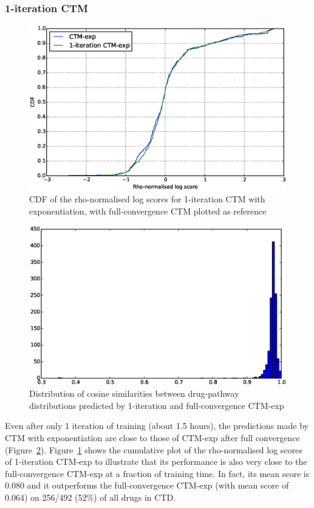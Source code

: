 \documentclass[12pt,a4paper,twoside,openright]{report}
\begin{document}
\subsubsection{1-iteration CTM}

\begin{figure}[!htb]
\includegraphics[width=\textwidth]{ctd-ctm-1iter-rho.eps}
\caption{CDF of the rho-normalised log scores for 1-iteration CTM with exponentiation, with full-convergence CTM plotted as reference}
\label{fig:ctd-ctm-1iter-rho}
\end{figure}

\begin{figure}[!htb]
\includegraphics[width=\textwidth]{ctd-ctm-1iter-hist.eps}
\caption{Distribution of cosine similarities between drug-pathway distributions predicted by 1-iteration and full-convergence CTM-exp}
\label{fig:ctd-ctm-1iter-hist}
\end{figure}

Even after only 1 iteration of training (about 1.5 hours), the predictions made by CTM with exponentiation are close to those of CTM-exp after full convergence (Figure~\ref{fig:ctd-ctm-1iter-hist}). Figure~\ref{fig:ctd-ctm-1iter-rho} shows the cumulative plot of the rho-normalised log scores of 1-iteration CTM-exp to illustrate that its performance is also very close to the full-convergence CTM-exp at a fraction of training time. In fact, its mean score is 0.080 and it outperforms the full-convergence CTM-exp (with mean score of 0.064) on 256/492 (52\%) of all drugs in CTD.
\end{document}
